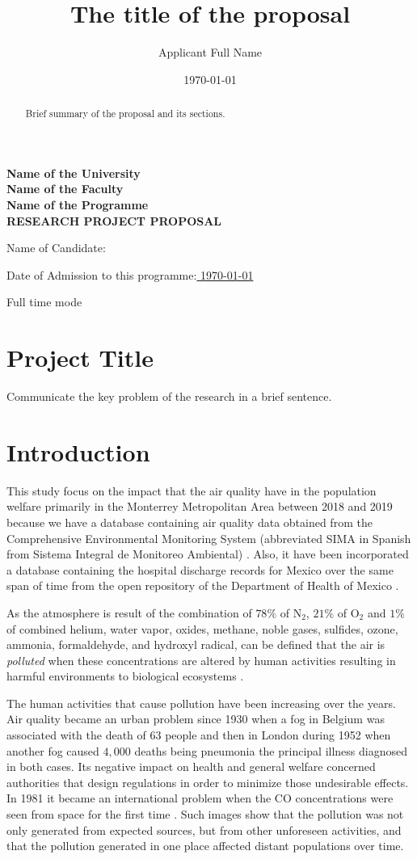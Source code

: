 \documentclass[
  11pt,
  a4paper,
  oneside
]{article}
\author{Applicant Full Name}
\date{\today}
\title{The title of the proposal}
\newcommand{\titlepart}{\thispagestyle{empty}
\pdfbookmark[0]{Front Page}{Front Page}
\label{sec:frontpage}
\begin{center}
\textbf{Name of the University\\
Name of the Faculty\\
Name of the Programme\\
\vspace{3ex}
RESEARCH PROJECT PROPOSAL}
\end{center}

\vspace{6ex}

Name of Candidate:\uline{
\phantom{xxxxxxxxxxxxxxxxxxx}
\theauthor
\hfill\phantom{x}}

\vspace{3ex}

Date of Admission to this programme:\uline{
\phantom{xxxxx}
\admissionDate
\hfill\phantom{x}}

\vspace{3ex}

\studyTimeMode

\leftskip=0.32in}
\newcommand{\admissionDate}{\today}
\newcommand{\studyTimeMode}{Full time mode}
\begin{document}
\titlepart

\begin{abstract}
    Brief summary of the proposal and its sections.
\end{abstract}

\section{Project Title}
Communicate the key problem of the research in a brief sentence.

\section{Introduction}
This study focus on the impact that the air quality have in the population welfare primarily in the Monterrey Metropolitan Area between 2018 and 2019 because we have a database containing air quality data obtained from the Comprehensive Environmental Monitoring System (abbreviated SIMA in Spanish from Sistema Integral de Monitoreo Ambiental) \citep{aireNL}. Also, it have been incorporated a database containing the hospital discharge records for Mexico over the same span of time from the open repository of the Department of Health of Mexico \cite{mexGobSS2020}.

As the atmosphere is result of the combination of $78\%$ of N$_2$,  $21\%$ of O$_2$ and $1\%$ of combined helium, water vapor, oxides, methane, noble gases, sulfides, ozone, ammonia, formaldehyde, and hydroxyl radical, can be defined that the air is \textit{polluted} when these concentrations are altered by human activities resulting in harmful environments to biological ecosystems \citep{thadEA2015}.

The human activities that cause pollution have been increasing over the years. Air quality became an urban problem since 1930 when a fog in Belgium was associated with the death of $63$ people and then in London during 1952 \citep{firket1936} when another fog caused $4,000$ deaths \citep{logan1953} being pneumonia the principal illness diagnosed in both cases. Its negative impact on health and general welfare concerned authorities that design regulations in order to minimize those undesirable effects. In 1981 it became an international problem when the CO concentrations were seen from space for the first time \citep{akimoto2003}. Such images show that the pollution was not only generated from expected sources, but from other unforeseen activities, and that the pollution generated in one place affected distant populations over time. 
\end{document}
